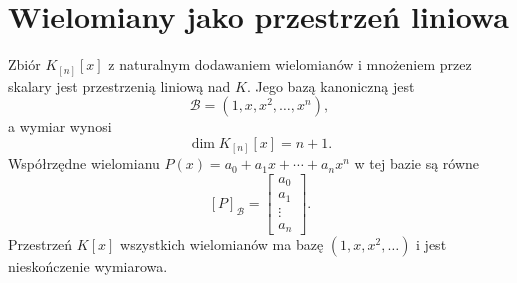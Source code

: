 \documentclass{article}
\begin{document}
\section{Wielomiany jako przestrzeń liniowa}
Zbiór $K_{[n]}[x]$ z naturalnym dodawaniem wielomianów i mnożeniem przez
skalary jest przestrzenią liniową nad $K$. Jego bazą kanoniczną jest
\[
    \mathcal{B}=(1,x,x^2,\ldots,x^n),
\]
a wymiar wynosi
\[
    \dim K_{[n]}[x]=n+1.
\]
Współrzędne wielomianu
$P(x)=a_0+a_1x+\cdots+a_nx^n$ w tej bazie są równe
\[
    [P]_{\mathcal{B}}=
    \begin{bmatrix}a_0\\a_1\\\vdots\\a_n\end{bmatrix}.
\]
Przestrzeń $K[x]$ wszystkich wielomianów ma bazę
$(1,x,x^2,\ldots)$ i jest nieskończenie wymiarowa.
\end{document}
